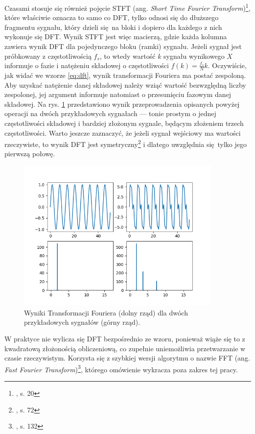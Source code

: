 Czasami stosuje się również pojęcie STFT (ang. \emph{Short Time Fourier Transform})\footnote{\cite{lerch_introduction_2012}, s. 20}, które właściwie oznacza to samo co DFT, tylko odnosi się do dłuższego fragmentu sygnału, który dzieli się na bloki i dopiero dla każdego z nich wykonuje się DFT. Wynik STFT jest więc macierzą, gdzie każda kolumna zawiera wynik DFT dla pojedynczego bloku (ramki) sygnału. Jeżeli sygnał jest próbkowany z częstotliwością $f_s$, to wtedy wartość $k$ sygnału wynikowego $X$ informuje o fazie i natężeniu składowej o częstotliwości $f(k) = \frac{f_s}{N}k$.  Oczywiście, jak widać we wzorze \ref{eq:dft}, wynik transformacji Fouriera ma postać zespoloną. Aby uzyskać natężenie danej składowej należy wziąć wartość bezwzględną liczby zespolonej, jej argument informuje natomiast o przesunięciu fazowym danej składowej. Na rys.  \ref{fig:transformata_fouriera} przedstawiono wynik przeprowadzenia opisanych powyżej operacji na dwóch przykładowych sygnałach --- tonie prostym o jednej częstotliwości składowej i bardziej złożonym sygnale, będącym złożeniem trzech częstotliwości. Warto jeszcze zaznaczyć, że jeżeli sygnał wejściowy ma wartości rzeczywiste, to wynik DFT jest symetryczny\footnote{\cite{lyons_wprowadzenie_2000}, s. 72} i dlatego uwzględnia się tylko jego pierwszą połowę.

\begin{figure}[htb]
    \centering
    \includegraphics[width=0.9\textwidth]{images/transformata_fouriera}
    \caption{Wyniki Transformacji Fouriera (dolny rząd) dla dwóch przykładowych sygnałów (górny rząd).}
    \label{fig:transformata_fouriera}
\end{figure}

W praktyce nie wylicza się DFT bezpośrednio ze wzoru, ponieważ wiąże się to z kwadratową złożonością obliczeniową, co zupełnie uniemożliwia przetwarzanie w czasie rzeczywistym. Korzysta się z szybkiej wersji algorytmu o nazwie FFT (ang. \emph{Fast Fourier Transform})\footnote{\cite{lyons_wprowadzenie_2000}, s. 132}, którego omówienie wykracza poza zakres tej pracy.

